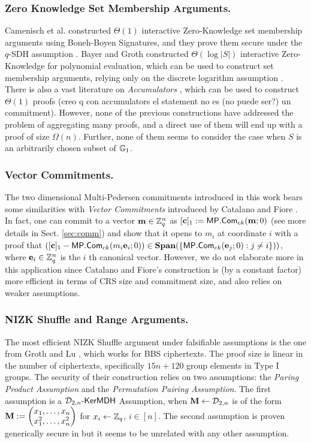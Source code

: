 \subsubsection{Zero Knowledge Set Membership Arguments.}
Camenisch et al. constructed $\Theta(1)$ interactive Zero-Knowledge set membership arguments using Boneh-Boyen Signatures, and they prove them secure under the $q$-SDH assumption \cite{AC:CamChaShe08}. Bayer and Groth constructed $\Theta(\log |S|)$ interactive Zero-Knowledge for polynomial evaluation, which can be used to construct set membership arguments, relying only on the discrete logarithm assumption \cite{EC:BayGro13}. There is also a vast literature on \emph{Accumulators} \cite{EC:BenDeM93,C:CamLys02,AC:TsuXu03,RSA:LNguyen05,PKC:CamKohSor09,ICICS:WanWanPie07}, which can be used to construct $\Theta(1)$ proofs {\color{red}(creo q con accumulators el statement no es (no puede ser?) un commitment)}. However, none of the previous constructions have addressed the problem of aggregating many proofs, and a direct use of them will end up with a proof of size $\Omega(n)$. Further, none of them seems to consider the case when $S$ is an arbitrarily chosen subset of $\mathbb{G}_1$.

\subsubsection{Vector Commitments.}
The two dimensional Multi-Pedersen commitments introduced in this work bears some similarities with \emph{Vector Commitments} introduced by Catalano and Fiore \cite{PKC:CatFio13}. In fact, one can commit to a vector $\mathbf{m}\in\mathbb{Z}_q^n$ as $[\mathbf{c}]_1:=\mathsf{MP}.\mathsf{Com}_{ck}(\mathbf{m};0)$ (see more details in Sect. \ref{sec:comm}) and show that it opens to $m_i$ at coordinate $i$ with a proof that $([\mathbf{c}]_1-\mathsf{MP}.\mathsf{Com}_{ck}(m_i\mathbf{e}_i;0))\in\mathbf{Span}(\{\mathsf{MP}.\mathsf{Com}_{ck}(\mathbf{e}_j;0):j\neq i\}))$, where $\mathbf{e}_i\in\mathbb{Z}_q^n$ is the $i$ th canonical vector. However, we do not elaborate more in this application since Catalano and Fiore's construction is (by a constant factor) more efficient in terms of CRS size and commitment size, and also relies on weaker assumptions.


\subsubsection{NIZK Shuffle and Range Arguments.}
The most efficient NIZK Shuffle argument under falsifiable assumptions is the one from Groth and Lu \cite{AC:GroLu07}, which works for BBS ciphertexts. The proof size is linear in the number of ciphertexts, specifically $15n + 120$ group elements in Type I groups. The security of their construction relies on two assumptions: the \emph{Paring Product Assumption} and the \emph{Permutation Pairing Assumption}. The first assumption is a $\mathcal{D}_{2,n}\mbox{-}\mathsf{KerMDH}$ Assumption, when $\mathbf{{M}}\gets\mathcal{D}_{2,n}$ is of the form $\mathbf{{M}}:=\left(\begin{matrix}x_1,\ldots,x_n\\x_1^2,\ldots,x_n^2\end{matrix}\right)$ for $x_i\gets\mathbb{Z}_q$, $i\in[n]$. The second assumption is proven generically secure in \cite{AC:GroLu07} but it seems to be unrelated with any other assumption.

